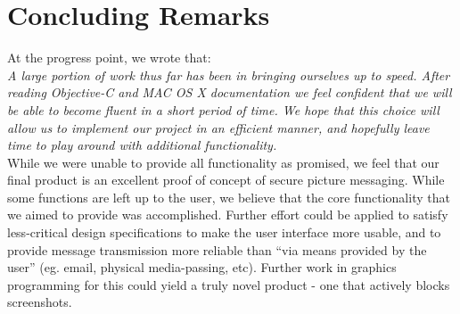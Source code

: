 \documentclass[11pt, a4paper,titlepage]{report}
\begin{document}
\section{Concluding Remarks}
At the progress point, we wrote that:\\

\noindent\emph{A large portion of work thus far has been in bringing ourselves up to speed. After reading Objective-C and MAC OS X documentation we feel confident that we will be able to become fluent in a short period of time. We hope that this choice will allow us to implement our project in an efficient manner, and hopefully leave time to play around with additional functionality.}\\

While we were unable to provide all functionality as promised, we feel that our final product is an excellent proof of concept of secure picture messaging. While some functions are left up to the user, we believe that the core functionality that we aimed to provide was accomplished. Further effort could be applied to satisfy less-critical design specifications to make the user interface more usable, and to provide message transmission more reliable than ``via means provided by the user'' (eg. email, physical media-passing, etc). Further work in graphics programming for this could yield a truly novel product - one that actively blocks screenshots.

\printbibliography 
\nocite{*}
\end{document}
